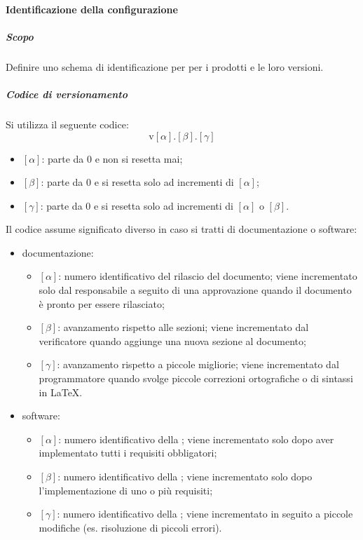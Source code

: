         \paragraph{Identificazione della configurazione}
            \subparagraph{Scopo}
            Definire uno schema di identificazione per per i prodotti e le loro versioni.

            \subparagraph{Codice di versionamento}
            Si utilizza il seguente codice:
            \[
            \text{v}[\alpha].[\beta].[\gamma]
            \]
            \begin{itemize}
                \item \([\alpha]\): parte da 0 e non si resetta mai;
                \item \([\beta]\): parte da 0 e si resetta solo ad incrementi di \([\alpha]\);
                \item \([\gamma]\): parte da 0 e si resetta solo ad incrementi di \([\alpha]\) o \([\beta]\).
            \end{itemize}
            Il codice assume significato diverso in caso si tratti di documentazione o software:
            \begin{itemize}
                \item documentazione:
                \begin{itemize}
                    \item \([\alpha]\): numero identificativo del rilascio del documento; viene incrementato solo dal responsabile a seguito di una approvazione quando il documento è pronto per essere rilasciato;
                    \item \([\beta]\): avanzamento rispetto alle sezioni; viene incrementato dal verificatore quando aggiunge una nuova sezione al documento;
                    \item \([\gamma]\): avanzamento rispetto a piccole migliorie; viene incrementato dal programmatore quando svolge piccole correzioni ortografiche o di sintassi in \LaTeX.
                \end{itemize}

                \item software:
                \begin{itemize}
                    \item \([\alpha]\): numero identificativo della ; viene incrementato solo dopo aver implementato tutti i requisiti obbligatori;
                    \item \([\beta]\): numero identificativo della ; viene incrementato solo dopo l'implementazione di uno o più requisiti;
                    \item \([\gamma]\): numero identificativo della ; viene incrementato in seguito a piccole modifiche (es. risoluzione di piccoli errori).
                \end{itemize}
            \end{itemize}

